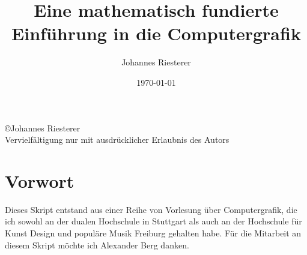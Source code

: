 \title{Eine mathematisch fundierte Einführung in die Computergrafik}
\author{Johannes Riesterer}
\date{\today}
\maketitle\thispagestyle{empty}
\newpage 
\begin{center}
\large
 \copyright Johannes Riesterer \\
Vervielfältigung nur mit ausdrücklicher Erlaubnis des Autors
\end{center}
\thispagestyle{empty}
\newpage

\section*{Vorwort}
\mbox{}\thispagestyle{empty}

Dieses Skript entstand aus einer Reihe von Vorlesung über Computergrafik, die ich sowohl an der dualen Hochschule in Stuttgart als auch an der Hochschule für 
Kunst Design und populäre Musik Freiburg gehalten habe. Für die Mitarbeit an diesem Skript möchte ich Alexander Berg  danken.

\newpage
